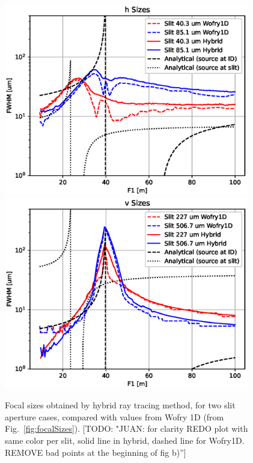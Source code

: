\documentclass{iucr}              %
\newcommand{\todo}[1]{{\color{red}[TODO: "#1'']}}
\begin{document}
\begin{figure}
    \centering

    \includegraphics[width=0.95\textwidth]{figures/sizes_h_hybrid.eps}
    \includegraphics[width=0.95\textwidth]{figures/sizes_v_hybrid.eps}
        
    \caption{Focal sizes obtained by hybrid ray tracing method, for two slit aperture cases, compared with values from Wofry 1D  (from Fig.~\ref{fig:focalSizes}).
    \todo{JUAN: for clarity REDO plot with same color per slit, solid line in hybrid, dashed line for Wofry1D.
    REMOVE bad points at the beginning of fig b)}
    }
    \label{fig:focalSizes_hybrid}
\end{figure}
\end{document}
